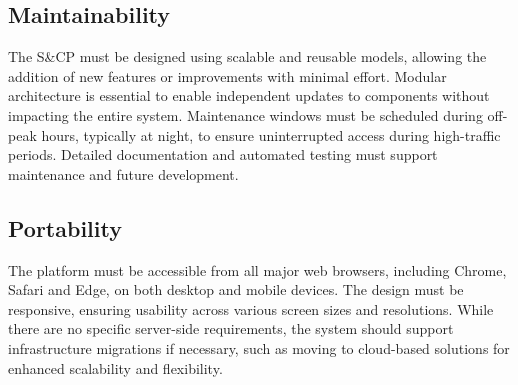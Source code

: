 \subsection{Maintainability}
The S\&CP must be designed using scalable and reusable models, allowing the addition of new features or improvements with minimal effort.
Modular architecture is essential to enable independent updates to components without impacting the entire system.
Maintenance windows must be scheduled during off-peak hours, typically at night, to ensure uninterrupted access during high-traffic periods.
Detailed documentation and automated testing must support maintenance and future development.

\subsection{Portability}
The platform must be accessible from all major web browsers, including Chrome, Safari and Edge, on both desktop and mobile devices.
The design must be responsive, ensuring usability across various screen sizes and resolutions.
While there are no specific server-side requirements, the system should support infrastructure migrations if necessary, such as moving to cloud-based solutions for enhanced scalability and flexibility.

